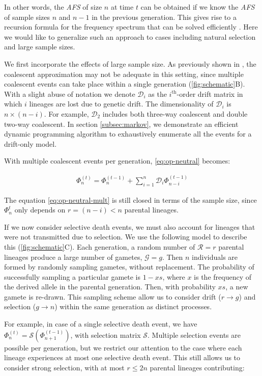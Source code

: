 \documentclass[review]{elsarticle}
\newcommand{\ra}{\rightarrow}
\begin{document}
In other words, the \textit{AFS} of size $n$ at time $t$ can be obtained if we know the \textit{AFS}
of sample sizes $n$ and $n-1$ in the previous generation. This gives rise to a recursion formula for
the frequency spectrum that can be solved efficiently \cite{JouganousEtAl2017}. Here we would like
to generalize such an approach to cases including natural selection and large sample sizes.

We first incorporate the effects of large sample size. As previously shown in
\cite{BhaskarEtAl2014,NelsonEtAl2019}, the coalescent approximation may not be adequate in this
setting, since multiple coalescent events can take place within a single generation
(\ref{fig:schematic}B). With a slight abuse of notation we denote $\mathcal{D}_i$ as the
$i^{\text{th}}$-order drift matrix in which $i$ lineages are lost due to genetic drift. The
dimensionality of $\mathcal{D}_i$ is $n \times (n-i)$. For example, $\mathcal{D}_2$ includes both
three-way coalescent and double two-way coalescent. In section \ref{subsec:markov}, we demonstrate an
efficient dynamic programming algorithm to exhaustively enumerate all the events for a drift-only
model.

With multiple coalescent events per generation, \eqref{eq:op-neutral} becomes:

\begin{align}
  \label{eq:op-neutral-mult}
  \Phi_{n}^{(t)}=\Phi_{n}^{(t-1)}+\sum_{i=1}^{n}\mathcal{D}_i \Phi_{n-i}^{(t-1)}
\end{align}

The equation \eqref{eq:op-neutral-mult} is still closed in terms of the sample size, since
$\Phi_{n}^{t}$ only depends on $r=(n-i)<n$ parental lineages. 


If we now consider selective death events, we must also account for lineages that were not
transmitted due to selection. We use the following model to describe this (\ref{fig:schematic}C).
Each generation, a random number of $\mathcal{R}=r$ parental lineages produce a large number of
gametes, $\mathcal{G}=g$. Then $n$ individuals are formed by randomly sampling gametes, without
replacement. The probability of successfully sampling a particular gamete is $1-xs$, where $x$ is
the frequency of the derived allele in the parental generation. Then, with probability $xs$, a new
gamete is re-drawn. This sampling scheme allow us to consider drift ($r \ra g$) and selection ($g
\ra n$) within the same generation as distinct processes.
 
For example, in case of a single selective death event, we have
$\Phi_{n}^{(t)}=\mathcal{S}(\Phi_{n+1}^{(t-1)})$, with selection matrix $\mathcal{S}$. Multiple
selection events are possible per generation, but we restrict our attention to the case where each
lineage experiences at most one selective death event. This still allows us to consider strong
selection, with at most $r\le 2n$ parental lineages contributing:
\end{document}
